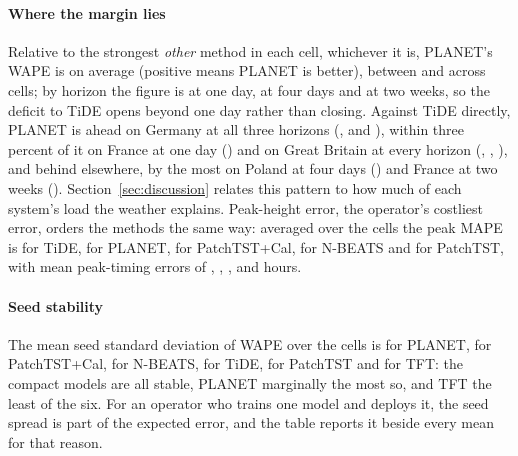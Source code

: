 \paragraph{Where the margin lies} Relative to the strongest \emph{other} method in each cell,
whichever it is, PLANET's WAPE is  on average (positive means
PLANET is better), between  and
 across cells; by horizon the figure is
 at one day,  at four
days and  at two weeks, so the deficit to TiDE opens
beyond one day rather than closing. Against TiDE directly, PLANET is ahead on Germany at all
three horizons (,
 and ),
within three percent of it on France at one day ()
and on Great Britain at every horizon (,
, ), and
behind elsewhere, by the most on Poland at four days
() and France at two weeks
(). Section~\ref{sec:discussion} relates this
pattern to how much of each system's load the weather explains. Peak-height error, the
operator's costliest error, orders the methods the same way: averaged over the cells the peak
MAPE is  for TiDE,  for PLANET,
 for PatchTST+Cal,  for N-BEATS and
 for PatchTST, with mean peak-timing errors of
, , ,
 and  hours.

\paragraph{Seed stability} The mean seed standard deviation of WAPE over the cells is
 for PLANET,  for PatchTST+Cal,
 for N-BEATS,  for TiDE,
 for PatchTST and  for TFT: the compact models are all stable, PLANET marginally the most so, and TFT the least of the
six. For an operator who trains one model and deploys it, the
seed spread is part of the expected error, and the table reports it beside every mean for that
reason.


